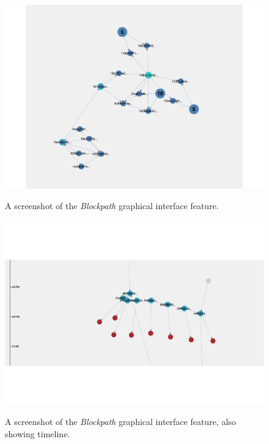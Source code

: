 \begin{figure}[h!]
  \centering
  \includegraphics[width = 15cm]{./figures/blockpath-evaluation}\\[0.5cm] 
  \caption{A screenshot of the \textit{Blockpath} graphical interface feature.}
  \label{fig:blockpath-graph-ui}
\end{figure}

\begin{figure}[h!]
  \centering
  \includegraphics[width = 15cm]{./figures/blockpath-time-org}\\[0.5cm] 
  \caption{A screenshot of the \textit{Blockpath} graphical interface feature, also showing timeline.}
  \label{fig:blockpath-graph-ui-time-organisation}
\end{figure}


